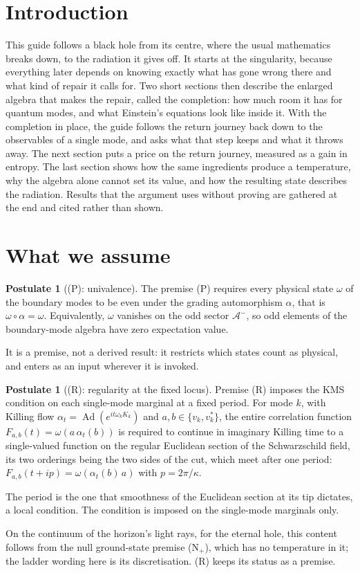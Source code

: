 \documentclass[11pt]{article}
\theoremstyle{definition}
\newtheorem{postulate}[theorem]{Postulate}
\theoremstyle{plain}
\providecommand{\Aod}{}\renewcommand{\Aod}{\mathcal{A}^{-}}
\begin{document}
\section*{Introduction}
This guide follows a black hole from its centre, where the usual mathematics breaks down, to the radiation it gives off. It starts at the singularity, because everything later depends on knowing exactly what has gone wrong there and what kind of repair it calls for. Two short sections then describe the enlarged algebra that makes the repair, called the completion: how much room it has for quantum modes, and what Einstein's equations look like inside it. With the completion in place, the guide follows the return journey back down to the observables of a single mode, and asks what that step keeps and what it throws away. The next section puts a price on the return journey, measured as a gain in entropy. The last section shows how the same ingredients produce a temperature, why the algebra alone cannot set its value, and how the resulting state describes the radiation. Results that the argument uses without proving are gathered at the end and cited rather than shown.

\section{What we assume}

\begin{postulate}[(P): univalence]\label{c:singularity.p-univalence}
The premise (P) requires every physical state $\omega$ of the boundary modes to be even under the grading automorphism $\alpha$, that is $\omega \circ \alpha = \omega$. Equivalently, $\omega$ vanishes on the odd sector $\Aod$, so odd elements of the boundary-mode algebra have zero expectation value.

It is a premise, not a derived result: it restricts which states count as physical, and enters as an input wherever it is invoked.
\end{postulate}

\begin{postulate}[(R): regularity at the fixed locus]\label{c:singularity.r-regularity-fixed-locus}
Premise (R) imposes the KMS condition on each single-mode marginal at a fixed period. For mode $k$, with Killing flow $\alpha_t = \operatorname{Ad}(e^{it\omega_k K_k})$ and $a, b \in \{v_k, v_k^{*}\}$, the entire correlation function $F_{a,b}(t) = \omega(a\,\alpha_t(b))$ is required to continue in imaginary Killing time to a single-valued function on the regular Euclidean section of the Schwarzschild field, its two orderings being the two sides of the cut, which meet after one period: $F_{a,b}(t + ip) = \omega(\alpha_t(b)\,a)$ with $p = 2\pi/\kappa$.

The period is the one that smoothness of the Euclidean section at its tip dictates, a local condition. The condition is imposed on the single-mode marginals only.

On the continuum of the horizon's light rays, for the eternal hole, this content follows from the null ground-state premise (N$_{+}$), which has no temperature in it; the ladder wording here is its discretisation. (R) keeps its status as a premise.
\end{postulate}
\end{document}
